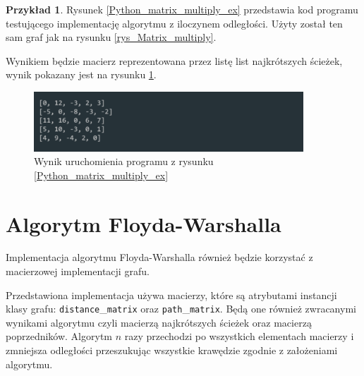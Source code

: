 \documentclass[12pt,a4paper]{book}
\theoremstyle{definition}
\newtheorem{ex}{Przykład}
\numberwithin{equation}{chapter}
\begin{document}
\begin{ex}

Rysunek \ref{Python_matrix_multiply_ex} przedstawia kod programu testującego implementację algorytmu z iloczynem odległości. Użyty został ten sam graf jak na rysunku \ref{rys_Matrix_multiply}.



Wynikiem będzie macierz reprezentowana przez listę list najkrótszych ścieżek, wynik pokazany jest na rysunku \ref{rys_wynik_matrix_multiply}.

\begin{figure}[H]
\centering
\includegraphics[width=0.9\textwidth]{images/matrix_multiply_example.pdf}
\caption{Wynik uruchomienia programu z rysunku \ref{Python_matrix_multiply_ex}}
\label{rys_wynik_matrix_multiply}
\end{figure}
\end{ex}

\section{Algorytm Floyda-Warshalla}

Implementacja algorytmu Floyda-Warshalla również będzie korzystać z macierzowej implementacji grafu.



Przedstawiona implementacja używa macierzy, które są atrybutami instancji klasy grafu: \texttt{distance}\_\texttt{matrix} oraz \texttt{path}\_\texttt{matrix}. Będą one również zwracanymi wynikami algorytmu czyli macierzą najkrótszych ścieżek oraz macierzą poprzedników. Algorytm $n$ razy przechodzi po wszystkich elementach macierzy i zmniejsza odległości przeszukując wszystkie krawędzie zgodnie z założeniami algorytmu.
\end{document}
